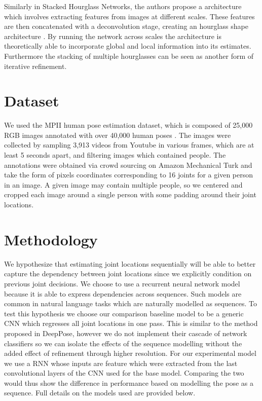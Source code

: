 \documentclass[11pt,twocolumn,letterpaper]{article}
\begin{document}
Similarly in Stacked Hourglass Networks, the authors propose a architecture which involves extracting features from images at different scales. These features are then concatenated with a deconvolution stage, creating an hourglass shape architecture \cite{newell2016stacked}. By running the network across scales the architecture is theoretically able to incorporate global and local information into its estimates. Furthermore the stacking of multiple hourglasses can be seen as another form of iterative refinement.


\section{Dataset}


We used the MPII human pose estimation dataset, which is composed of 25,000 RGB 
images annotated with over 40,000 human poses \cite{andriluka20142d}. The images were collected by sampling 3,913 videos from Youtube in various frames, which are at least 5 seconds apart, and filtering images which contained people. The annotations were obtained via crowd sourcing on Amazon Mechanical Turk and take the form of pixels coordinates 
corresponding to 16 joints for a given person in an image. A given image
may contain multiple people, so we centered and cropped each image around a single person with some padding around their joint locations.


\section{Methodology}

We hypothesize that estimating joint locations sequentially will be able to better capture the dependency between joint locations since we explicitly condition on previous joint decisions. We choose to use a recurrent neural network model because it is able to express dependencies across sequences. Such models are common in natural language tasks which are naturally modelled as sequences. To test this hypothesis we choose our comparison baseline model to be a generic CNN which regresses all joint locations in one pass. This is similar to the method proposed in DeepPose, however we do not implement their cascade of network classifiers so we can isolate the effects of the sequence modelling without the added effect of refinement through higher resolution. For our experimental model we use a RNN whose inputs are feature which were extracted from the last convolutional layers of the CNN used for the base model. Comparing the two would thus show the difference in performance based on modelling the pose as a sequence. Full details on the models used are provided below.
\end{document}
